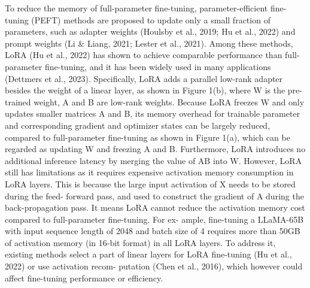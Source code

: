 \documentclass[withindex,glossary,firstyr]{cam-thesis}
\begin{document}
To reduce the memory of full-parameter fine-tuning, parameter-efficient fine-tuning (PEFT) methods are proposed to update only a small fraction of parameters, such as adapter weights (Houlsby et al., 2019; Hu et al., 2022) and prompt weights (Li & Liang, 2021; Lester et al., 2021). Among these methods, LoRA (Hu et al., 2022) has shown to achieve comparable performance than full-parameter fine-tuning, and it has been widely used in many applications (Dettmers et al., 2023).
Specifically, LoRA adds a parallel low-rank adapter besides the weight of a linear layer, as shown in Figure 1(b), where W is the pre-trained weight, A and B are low-rank weights. Because LoRA freezes W and only updates smaller matrices A and B, its memory overhead for trainable parameter and corresponding gradient and optimizer states can be largely reduced, compared to full-parameter fine-tuning as shown in Figure 1(a), which can be regarded as updating W and freezing A and B. Furthermore, LoRA introduces no additional inference latency by merging the value of AB into W. However, LoRA still has limitations as it requires expensive activation memory consumption in LoRA layers. This is because the large input activation of X needs to be stored during the feed- forward pass, and used to construct the gradient of A during the back-propagation pass. It means LoRA cannot reduce the activation memory cost compared to full-parameter fine-tuning. For ex- ample, fine-tuning a LLaMA-65B with input sequence length of 2048 and batch size of 4 requires more than 50GB of activation memory (in 16-bit format) in all LoRA layers. To address it, existing methods select a part of linear layers for LoRA fine-tuning (Hu et al., 2022) or use activation recom- putation (Chen et al., 2016), which however could affect fine-tuning performance or efficiency.




\end{document}
